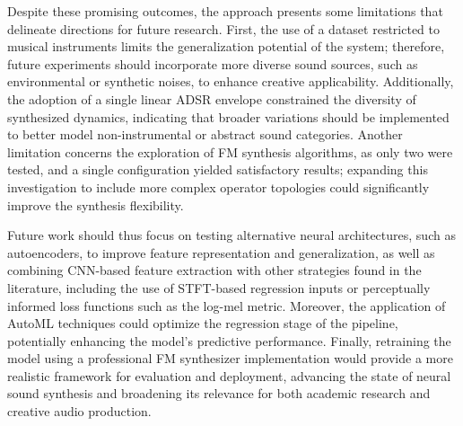 \documentclass[sigconf,natbib=false]{acmart}
\begin{document}
Despite these promising outcomes, the approach presents some limitations that delineate directions for future research. First, the use of a dataset restricted to musical instruments limits the generalization potential of the system; therefore, future experiments should incorporate more diverse sound sources, such as environmental or synthetic noises, to enhance creative applicability. Additionally, the adoption of a single linear ADSR envelope constrained the diversity of synthesized dynamics, indicating that broader variations should be implemented to better model non-instrumental or abstract sound categories. Another limitation concerns the exploration of FM synthesis algorithms, as only two were tested, and a single configuration yielded satisfactory results; expanding this investigation to include more complex operator topologies could significantly improve the synthesis flexibility.

Future work should thus focus on testing alternative neural architectures, such as autoencoders, to improve feature representation and generalization, as well as combining CNN-based feature extraction with other strategies found in the literature, including the use of STFT-based regression inputs or perceptually informed loss functions such as the log-mel metric. Moreover, the application of AutoML techniques could optimize the regression stage of the pipeline, potentially enhancing the model’s predictive performance. Finally, retraining the model using a professional FM synthesizer implementation would provide a more realistic framework for evaluation and deployment, advancing the state of neural sound synthesis and broadening its relevance for both academic research and creative audio production.

\balance



\end{document}
